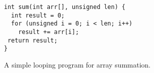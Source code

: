 \begin{figure}
\centering
\begin{lstlisting}
int sum(int arr[], unsigned len) {
  int result = 0;
  for (unsigned i = 0; i < len; i++)
    result += arr[i];
 return result;
}
\end{lstlisting}
\caption{A simple looping program for array summation.}
\end{figure}